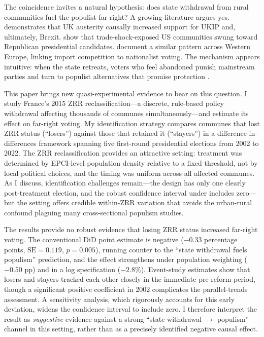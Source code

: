 \documentclass[12pt]{article}
\begin{document}
The coincidence invites a natural hypothesis: does state withdrawal from rural communities fuel the populist far right? A growing literature argues yes. \citet{fetzer2019austerity} demonstrates that UK austerity causally increased support for UKIP and, ultimately, Brexit. \citet{autor2020importing} show that trade-shock-exposed US communities swung toward Republican presidential candidates. \citet{colantone2018trade} document a similar pattern across Western Europe, linking import competition to nationalist voting. The mechanism appears intuitive: when the state retreats, voters who feel abandoned punish mainstream parties and turn to populist alternatives that promise protection \citep{rodrik2021populism, guiso2019global}.

This paper brings new quasi-experimental evidence to bear on this question. I study France's 2015 ZRR reclassification---a discrete, rule-based policy withdrawal affecting thousands of communes simultaneously---and estimate its effect on far-right voting. My identification strategy compares communes that lost ZRR status (``losers'') against those that retained it (``stayers'') in a difference-in-differences framework spanning five first-round presidential elections from 2002 to 2022. The ZRR reclassification provides an attractive setting: treatment was determined by EPCI-level population density relative to a fixed threshold, not by local political choices, and the timing was uniform across all affected communes. As I discuss, identification challenges remain---the design has only one clearly post-treatment election, and the robust confidence interval under \citet{rambachan2023more} includes zero---but the setting offers credible within-ZRR variation that avoids the urban-rural confound plaguing many cross-sectional populism studies.

The results provide no robust evidence that losing ZRR status increased far-right voting. The conventional DiD point estimate is negative ($-0.33$ percentage points, $\text{SE} = 0.119$, $p = 0.005$), running counter to the ``state withdrawal fuels populism'' prediction, and the effect strengthens under population weighting ($-0.50$ pp) and in a log specification ($-2.8\%$). Event-study estimates show that losers and stayers tracked each other closely in the immediate pre-reform period, though a significant positive coefficient in 2002 complicates the parallel-trends assessment. A \citet{rambachan2023more} sensitivity analysis, which rigorously accounts for this early deviation, widens the confidence interval to include zero. I therefore interpret the result as \textit{suggestive} evidence against a strong ``state withdrawal $\to$ populism'' channel in this setting, rather than as a precisely identified negative causal effect.
\end{document}

